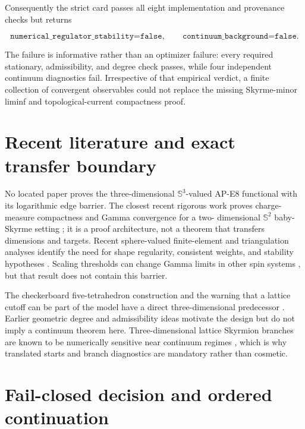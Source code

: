 \documentclass[11pt]{article}
\numberwithin{equation}{section}
\theoremstyle{definition}
\theoremstyle{remark}
\newcommand{\SSS}{\mathbb S}
\begin{document}
Consequently the strict card passes all eight implementation and provenance
checks but returns

\[
 \boxed{\texttt{numerical\_regulator\_stability=false},\qquad
        \texttt{continuum\_background=false}.}
\]

The failure is informative rather than an optimizer failure: every required
stationary, admissibility, and degree check passes, while four independent
continuum diagnostics fail.  Irrespective of that empirical verdict, a
finite collection of convergent observables could not replace the missing
Skyrme-minor liminf and topological-current compactness proof.

\section{Recent literature and exact transfer boundary}

No located paper proves the three-dimensional $\SSS^3$-valued AP-E8
functional with its logarithmic edge barrier.  The closest recent rigorous
work proves charge-measure compactness and Gamma convergence for a two-
dimensional $\SSS^2$ baby-Skyrme setting
\cite{BrianiCicaleseKreutz2026}; it is a proof architecture, not a theorem
that transfers dimensions and targets.  Recent sphere-valued finite-element
and triangulation analyses identify the need for shape regularity,
consistent weights, and stability hypotheses
\cite{BartelsBoehnleinPalusSander2025,GasterLoustauMonsaingeon2023,
BartelsPalusWang2023}.  Scaling thresholds can change Gamma limits in other
spin systems \cite{CicaleseReggianiSolombrino2024}, but that result does not
contain this barrier.

The checkerboard five-tetrahedron construction and the warning that a lattice
cutoff can be part of the model have a direct three-dimensional predecessor
\cite{SchrammSvetitsky2000}.  Earlier geometric degree and admissibility ideas
\cite{BergLuescher1981,Luescher1982} motivate the design but do not imply a
continuum theorem here.  Three-dimensional lattice Skyrmion branches are
known to be numerically sensitive near continuum regimes
\cite{CharalampidisIoannidouKevrekidis2015}, which is why translated starts
and branch diagnostics are mandatory rather than cosmetic.

\section{Fail-closed decision and ordered continuation}
\end{document}

